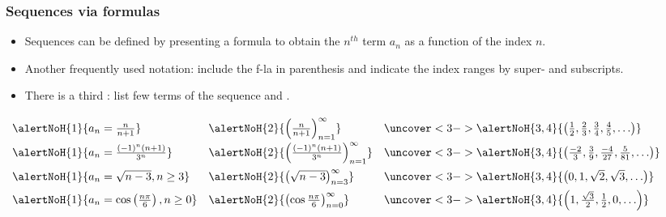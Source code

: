 \begin{frame}
\frametitle{Sequences via formulas}
\begin{itemize}
\item Sequences can be defined by presenting a formula to obtain the $n^{th}$ term $a_n$ as a function of the index $n$.
\item<2-> Another frequently used notation: include the f-la in parenthesis and indicate the index ranges by super- and subscripts.
\item<3-> There is a third : list few terms of the sequence and . 
\end{itemize}
\vskip -0.15cm
\begin{example}
$
\renewcommand{\arraystretch}{1.7}
\begin{array}{lll}
\alertNoH{1}{a_n = \frac{n}{n+1}} & %
\alertNoH{2}{ \left( \frac{n}{n+1}\right)_{n=1}^{\infty}} &
\uncover<3->{\alertNoH{3,4}{\left( \frac{1}{2}, \frac{2}{3}, \frac{3}{4}, \frac{4}{5}, \ldots \right)}} \\%
\alertNoH{1}{a_n = \frac{(-1)^n(n+1)}{3^n}} &%
\alertNoH{2}{ \left( \frac{(-1)^n(n+1)}{3^n} \right)_{n=1}^{\infty}} &%
\uncover<3->{\alertNoH{3,4}{\left( \frac{-2}{3}, \frac{3}{9}, \frac{-4}{27}, \frac{5}{81}, \ldots \right)}}\\%
\alertNoH{1}{a_n = \sqrt{n-3}, n\geq 3}&%
\alertNoH{2}{\left( \sqrt{n-3}\right)_{n=3}^\infty} &%
\uncover<3->{\alertNoH{3,4}{\left( 0, 1, \sqrt{2}, \sqrt{3}, \ldots \right)}}\\%
\alertNoH{1}{a_n = \cos \left(\frac{n\pi}{6}\right), n\geq 0}&%
\alertNoH{2}{ \left( \cos \frac{n\pi}{6}\right)_{n=0}^\infty} &%
\uncover<3->{\alertNoH{3,4}{\left( 1, \frac{\sqrt{3}}{2}, \frac{1}{2}, 0, \ldots \right)}}\\%
\end{array}
$
\end{example}
\end{frame}
